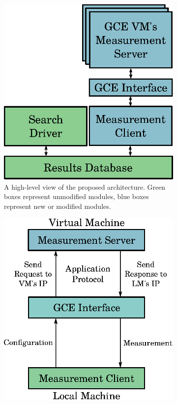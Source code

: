 \documentclass[a4paper, 12pt]{article}
\begin{document}
\begin{figure}[htpb]
    \centering
    \begin{subfigure}{.45\textwidth}
        \centering
        \includegraphics[scale=.75]{high-level-implementation}
        \caption{A high-level view of the proposed architecture.
        Green boxes represent unmodified modules, blue boxes represent
        new or modified modules.}
        \label{fig:high-level}
    \end{subfigure}%
    \hfill
    \begin{subfigure}{.45\textwidth}
        \centering
        \includegraphics[scale=.75]{low-level-implementation}

\end{subfigure}
\end{figure}
\end{document}

